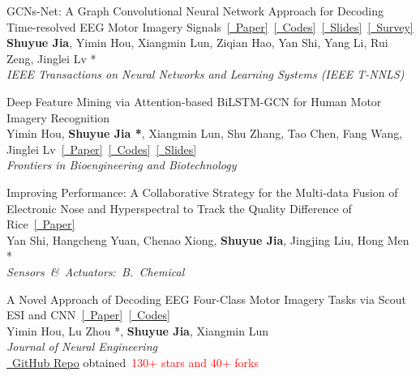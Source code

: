 \documentclass{my_cv}
\begin{document}
\hspace*{\fill}

\workitemsone
{GCNs-Net: A Graph Convolutional Neural Network Approach for Decoding Time-resolved EEG Motor Imagery Signals~\href{https://ieeexplore.ieee.org/document/9889159}{[\aiIEEE~Paper]}~\href{https://github.com/SuperBruceJia/EEG-DL}{[\faGithub~Codes]}~\href{https://shuyuej.com/files/EEG/GCNs-Net-Presentation.pdf}{[\faFile~Slides]}~\href{https://shuyuej.com/files/Dynamic-GCN-Survey.pdf}{[\faFile~Survey]}\\
\textbf{Shuyue Jia}, Yimin Hou, Xiangmin Lun, Ziqian Hao, Yan Shi, Yang Li, Rui Zeng, Jinglei Lv *\\
\emph{IEEE Transactions on Neural Networks and Learning Systems (IEEE T-NNLS)}
}

\hspace*{\fill}

\workitemsone
{Deep Feature Mining via Attention-based BiLSTM-GCN for Human Motor Imagery Recognition\\
Yimin Hou, \textbf{Shuyue Jia *}, Xiangmin Lun, Shu Zhang, Tao Chen, Fang Wang, Jinglei Lv~\href{https://www.frontiersin.org/articles/10.3389/fbioe.2021.706229/abstract}{[\aiOpenAccess~Paper]}~\href{https://github.com/SuperBruceJia/EEG-DL}{[\faGithub~Codes]}~\href{https://shuyuej.com/files/EEG/BiLSTM-GCN-Presentation.pdf}{[\faFile~Slides]}\\
\emph{Frontiers in Bioengineering and Biotechnology}
}

\hspace*{\fill}

\workitemsone
{Improving Performance: A Collaborative Strategy for the Multi-data Fusion of Electronic Nose and Hyperspectral to Track the Quality Difference of Rice~\href{https://www.sciencedirect.com/science/article/abs/pii/S0925400521001143}{[\aiElsevier~Paper]} \\
Yan Shi, Hangcheng Yuan, Chenao Xiong, \textbf{Shuyue Jia}, Jingjing Liu, Hong Men *\\
\emph{Sensors~\&~Actuators:~B.~Chemical}
}

\hspace*{\fill}

\workitemsone
{A Novel Approach of Decoding EEG Four-Class Motor Imagery Tasks via Scout ESI and CNN~\href{https://iopscience.iop.org/article/10.1088/1741-2552/ab4af6/meta}{[\aiOpenAccess~Paper]}~\href{https://github.com/SuperBruceJia/EEG-Motor-Imagery-Classification-CNNs-TensorFlow}{[\faGithub~Codes]}\\
Yimin Hou, Lu Zhou *, \textbf{Shuyue Jia}, Xiangmin Lun\\
\emph{Journal of Neural Engineering}\\
\href{https://github.com/SuperBruceJia/EEG-Motor-Imagery-Classification-CNNs-TensorFlow}{\faGithub~GitHub Repo} obtained~\textcolor{red}{130+ stars and 40+ forks}
}
\end{document}
